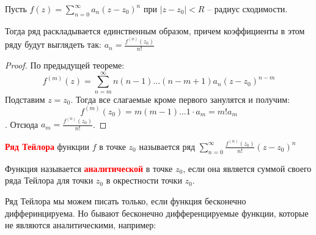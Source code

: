 
\begin{theorem} \thmslashn
	
	Пусть $f(z) = \sum\limits_{n=0}^{\infty} a_n(z - z_0)^n$ при $|z-z_0| < R$ -- радиус сходимости.
	
	Тогда ряд раскладывается единственным образом, причем коэффициенты в этом ряду будут выглядеть так: $a_n = \frac{f^{(n)}(z_0)}{n!}$
	\begin{proof} \thmslashn
	
		По предыдущей теореме:
		\[
		f^{(m)}(z) = \sum\limits_{n=m}^{\infty} n(n-1)\ldots(n-m+1)a_n(z-z_0)^{n-m}
		\]
		Подставим $z = z_0$. Тогда все слагаемые кроме первого занулятся и получим: 
		\[
		f^{(m)}(z_0) = m(m-1)\ldots1\cdot a_m = m!a_m
		\].
		Отсюда $a_m = \frac{f^{(n)}(z_0)}{n!}$.
	\end{proof}
\end{theorem}

\begin{definition} \thmslashn
	
	\textcolor{red}{\textbf{Ряд Тейлора}} функции $f$ в точке $z_0$ называется ряд $\sum\limits_{n=0}^{\infty} \frac{f^{(n)}(z_0)}{n!}(z-z_0)^n$
\end{definition}

\begin{definition} \thmslashn
	
	Функция называется \textcolor{red}{\textbf{аналитической}} в точке $z_0$, если она является суммой своего ряда Тейлора для точки $z_0$ в окрестности точки $z_0$.
\end{definition}

Ряд Тейлора мы можем писать только, если функция бесконечно дифферинцируема. Но бывают бесконечно дифференцируемые функции, которые не являются аналитическими, например:

